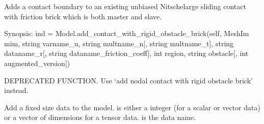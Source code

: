 \documentclass[a4paper,11pt,english]{sphinxmanual}
\begin{document}
\begin{fulllineitems}
\begin{fulllineitems}
\end{fulllineitems}


\begin{fulllineitems}
\label{\detokenize{python/cmdref_Model:getfem.Model.add_contact_boundary_to_unbiased_Nitsche_large_sliding_contact_brick}}
Adds a contact boundary to an existing unbiased Nitschelarge sliding contact
with friction brick which is both master and slave.

\end{fulllineitems}


\begin{fulllineitems}
\label{\detokenize{python/cmdref_Model:getfem.Model.add_contact_with_rigid_obstacle_brick}}
Synopsis: ind = Model.add\_contact\_with\_rigid\_obstacle\_brick(self,  MeshIm mim, string varname\_u, string multname\_n{[}, string multname\_t{]}, string dataname\_r{[}, string dataname\_friction\_coeff{]}, int region, string obstacle{[},  int augmented\_version{]})

DEPRECATED FUNCTION. Use ‘add nodal contact with rigid obstacle brick’ instead.

\end{fulllineitems}


\begin{fulllineitems}
\label{\detokenize{python/cmdref_Model:getfem.Model.add_data}}
Add a fixed size data to the model.   is either a
integer (for a scalar or vector data) or a vector of dimensions
for a tensor data.  is the data name.


\end{fulllineitems}
\end{fulllineitems}
\end{document}
